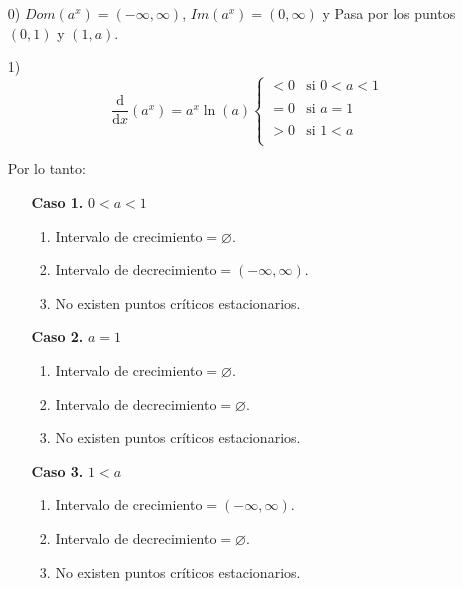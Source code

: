 \documentclass{article}
\numberwithin{equation}{section}
\newcommand{\derivate}[2]{\frac{\mathrm{d}}{\mathrm{d}#1} \left(  {#2}  \right)  }
\begin{document}
\begin{enumerate}
    \item[0)] $Dom(a^x)=(-\infty,\infty)$, $Im(a^x)=(0,\infty)$ y Pasa por los puntos $(0,1)$ y $(1,a)$.
    \item[1)] $$ \derivate{x}{a^x}=a^x\ln(a)
    \left\{
        \begin{array}{lll}
            <0  & \mbox{si } 0<a<1 \\
            \\ =0 & \mbox{si } a=1 \\
            \\ >0 & \mbox{si } 1<a \\
        \end{array}
    \right.$$
    
    Por lo tanto:
    
    \begin{enumerate}
    
    \item[\textbf{Caso 1.}]  $0<a<1$
    \begin{enumerate}
    \item Intervalo de crecimiento$=\varnothing$.
    \item Intervalo de decrecimiento$=(-\infty,\infty)$.
    \item No existen puntos críticos estacionarios.
    \end{enumerate} 
    
    \item[\textbf{Caso 2.}]  $a=1$
    \begin{enumerate}
    \item Intervalo de crecimiento$=\varnothing$.
    \item Intervalo de decrecimiento$=\varnothing$.
    \item No existen puntos críticos estacionarios.
    \end{enumerate} 
    
    \item[\textbf{Caso 3.}]  $1<a$
    \begin{enumerate}
    \item Intervalo de crecimiento$=(-\infty,\infty)$.
    \item Intervalo de decrecimiento$=\varnothing$.
    \item No existen puntos críticos estacionarios.
    \end{enumerate} 
    
    \end{enumerate}
    

\end{enumerate}
\end{document}
